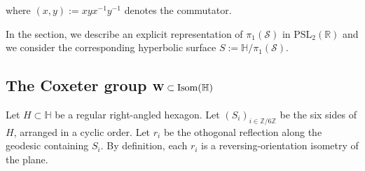 \documentclass[10pt,a4paper]{amsart}
\newcommand{\HP}{\mathbb{H}}
\newcommand{\R}{\mathbb{R}}
\newcommand{\Z}{\mathbb{Z}}
\newcommand{\Isom}{\mathrm{Isom}}
\newcommand{\PSL}{{\mathrm {PSL}}}
\newcommand{\cS}{\mathcal{S}}
\begin{document}
\noindent
where  $(x,y):=xyx^{-1}y^{-1}$ denotes
the commutator. 

In the section, we describe an explicit representation of $\pi_1(\cS)$  in 
$\PSL_2(\R)$ and we consider the corresponding hyperbolic surface 
$S:=\HP/\pi_1(\cS)$.

\subsection{The Coxeter group  ${\bf W}\subset \Isom(\HP)$}

Let  $H\subset\HP$ be a regular right-angled hexagon. 
Let $(S_i)_{i\in\Z/6\Z}$ be the six sides of $H$, arranged in a cyclic order. Let $r_i$ be the
othogonal reflection along the geodesic containing $S_i$. By definition, each $r_i$ is a 
reversing-orientation isometry of the plane.
\end{document}
